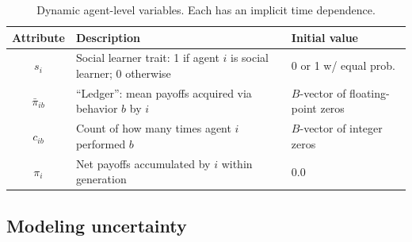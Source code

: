 \documentclass[letterpaper,11.5pt]{scrartcl}
\begin{document}
\begin{table}[h]
    \caption{Dynamic agent-level variables. Each has an implicit time dependence.}
    \label{tab:modelParameters}
    \centering %
    \begin{tabular}{cp{2.5in}p{1.0in}} \toprule

        Attribute & Description & Initial value \\ 

        \midrule  

        $s_i$  & Social learner trait: 1 if agent $i$ is social learner; 0 otherwise & 0
        or 1 w/ equal prob. \\

        $\bar\pi_{ib}$ & ``Ledger'': mean payoffs acquired via behavior $b$ by $i$ 
                       & $B$-vector of floating-point zeros \\

        $c_{ib}$ & Count of how many times agent $i$ performed $b$ 
              & $B$-vector of integer zeros \\

        $\pi_i$ & Net payoffs accumulated by $i$ within generation
                                & 0.0 \\
        \bottomrule
    \end{tabular}
\end{table}
\subsection{Modeling uncertainty}
\end{document}
